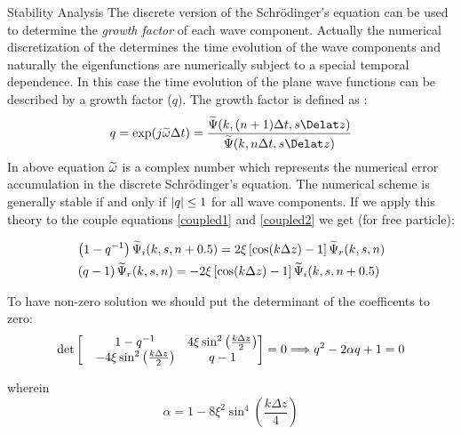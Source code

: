 \begin{homeworkProblem}
\begin{homeworkSection}{Stability Analysis}
The discrete version of the Schr\"odinger's equation can be used to determine the \textit{growth factor} of each wave component. Actually the numerical discretization of the determines the time evolution of the wave components and naturally the eigenfunctions are numerically subject to a special temporal dependence. In this case the time evolution of the plane wave functions can be described by a growth factor ($q$). The growth factor is defined as :
\begin{equation}
q=\exp(j\T{\omega}\Delta t)=\frac{\T{\Psi}(k,(n+1)\Delta t,s\Delat z)}{\T{\Psi}(k,n\Delta t,s\Delat z)}
\end{equation} 
In above equation $\widetilde{\omega}$ is a complex number which represents the numerical error accumulation in the discrete Schr\"odinger's equation. The numerical scheme is generally stable if and only if $\lvert q\rvert\leq 1$ for all wave components. If we apply this theory to the couple equations \eqref{coupled1} and \eqref{coupled2} we get (for free particle):

\begin{align}
&\left(1-q^{-1}\right)\widetilde{\Psi}_i(k,s,n+0.5) =2\xi\left[\cos(k\Delta z)-1\right]\widetilde{\Psi}_r(k,s,n)\\
&\left(q-1\right)\widetilde{\Psi}_r(k,s,n)=-2\xi\left[\cos(k\Delta z)-1\right]\widetilde{\Psi}_i(k,s,n+0.5) 
\end{align}
 
 To have non-zero solution we should put the determinant of the coefficents to zero:
  \begin{equation}
  \det
  \begin{bmatrix}
  & 1-q^{-1} &  4\xi \sin^2\left(\frac{k\Delta z}{2}\right)\\
  &-4\xi \sin^2\left(\frac{k\Delta z}{2}\right) & q-1
  \end{bmatrix}
  =0\Longrightarrow q^2-2\alpha q+1=0
  \end{equation}  
 
 wherein 
 $$\alpha=1-8\xi^2\sin^{4}\left(\frac{k\Delta z}{4}\right)$$
 

\end{homeworkSection}
\end{homeworkProblem}
